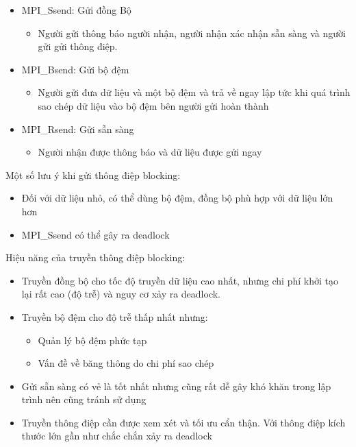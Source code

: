 \documentclass[14pt, a4paper]{article}
\numberwithin{equation}{section}
\numberwithin{figure}{section}
\numberwithin{dl}{section}
\numberwithin{md}{section}
\numberwithin{bd}{section}
\numberwithin{dn}{section}
\numberwithin{hq}{section}
\begin{document}
\begin{itemize}
    \item MPI\_Ssend: Gửi đồng Bộ
    \begin{itemize}
        \item Người gửi thông báo người nhận, người nhận xác nhận sẵn sàng và người gửi gửi thông điệp.
    \end{itemize}
    \item MPI\_Bsend: Gửi bộ đệm
    \begin{itemize}
        \item Người gửi đưa dữ liệu và một bộ đệm và trả về ngay lập tức khi quá trình sao chép dữ liệu vào bộ đệm bên người gửi hoàn thành
    \end{itemize}
    \item MPI\_Rsend: Gửi sẵn sàng
    \begin{itemize}
        \item Người nhận được thông báo và dữ liệu được gửi ngay
    \end{itemize}
\end{itemize}

Một số lưu ý khi gửi thông điệp blocking:

\begin{itemize}
    \item Đối với dữ liệu nhỏ, có thể dùng bộ đệm, đồng bộ phù hợp với dữ liệu lớn hơn
    \item MPI\_Ssend có thể gây ra deadlock
\end{itemize}

Hiệu năng của truyền thông điệp blocking:

\begin{itemize}
    \item Truyền đồng bộ  cho tốc độ truyền dữ liệu cao nhất, nhưng chi phí khởi tạo lại rất cao (độ trễ) và nguy cơ xảy ra deadlock.
    \item Truyền bộ đệm cho độ trễ thấp nhất nhưng:
    \begin{itemize}
        \item Quản lý bộ đệm phức tạp
        \item Vấn đề về băng thông do chi phí sao chép
    \end{itemize}
    \item Gửi sẵn sàng có vẻ là tốt nhất nhưng cũng rất dễ gây khó khăn trong lập trình nên cũng tránh sử dụng
    \item Truyền thông điệp cần được xem xét và tối ưu cẩn thận. Với thông điệp kích thước lớn gần như chắc chắn xảy ra deadlock
\end{itemize}
\end{document}
